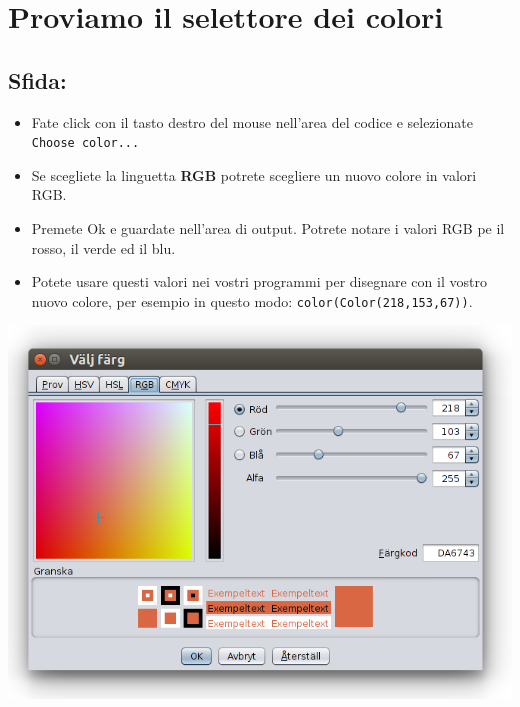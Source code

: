 \chapter{Proviamo il selettore dei colori}
\begin{multicols}{2}
\section*{\color{BrickRed}Sfida:}


\begin{itemize}

\item {Fate click con il tasto destro del mouse nell'area del codice e selezionate \lstinline{Choose color...}}
\item {Se scegliete la linguetta {\bf RGB} potrete scegliere un nuovo colore in valori RGB.}
\item {Premete Ok e guardate nell'area di output. Potrete notare i valori RGB pe il rosso, il verde ed il blu.}
\item {Potete usare questi valori nei vostri programmi per disegnare con il vostro nuovo colore, per esempio in questo modo: \lstinline{color(Color(218,153,67))}.}

\end{itemize}



\columnbreak

\begin{center}
\includegraphics[width=14.0cm]{../img/color-chooser-rgb-sv.png}
\end{center}

\end{multicols}


